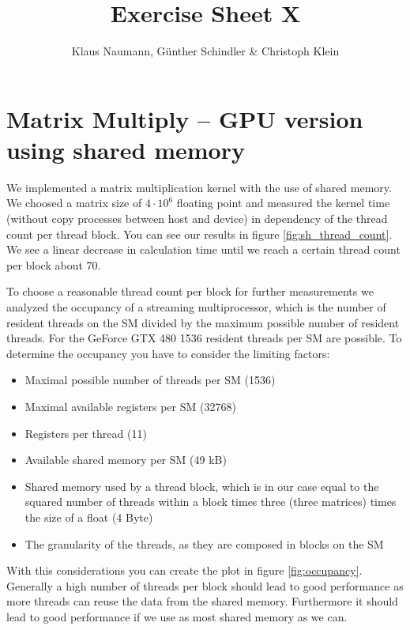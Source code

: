 \documentclass[DIV=12,oneside,a4paper]{scrartcl}
\begin{document}

\title{Exercise Sheet X}
\author{Klaus Naumann, G\"unther Schindler \& Christoph Klein}
\maketitle


\section{Matrix Multiply -- GPU version using shared memory}
We implemented a matrix multiplication kernel with the
use of shared memory. We choosed a matrix size of
$4\cdot 10^{6}$ floating point and measured the kernel time
(without copy processes between host and device) in dependency
of the thread count per thread block. You can see our results
in figure \ref{fig:sh_thread_count}. We see a linear decrease
in calculation time until we reach a certain thread count per
block about $70$. 

To choose a reasonable thread count per block
for further measurements we analyzed the occupancy of a streaming
multiprocessor, which is the number of resident threads on the
SM divided by the maximum possible number of resident threads.
For the GeForce GTX 480 1536 resident threads per SM are possible.
To determine the occupancy you have to consider the limiting 
factors:
\begin{itemize}
    \item Maximal possible number of threads per SM (1536)
    \item Maximal available registers per SM (32768)
    \item Registers per thread (11)
    \item Available shared memory per SM (49 kB)
    \item Shared memory used by a thread block, which is
        in our case equal to the squared number of threads
        within a block times three (three matrices) 
        times the size of a float (4 Byte)
    \item The granularity of the threads, as they are
        composed in blocks on the SM
\end{itemize}
With this considerations you can create the plot in figure
\ref{fig:occupancy}. Generally a high number of threads per
block should lead to good performance as more threads can
reuse the data from the shared memory. Furthermore it should
lead to good performance if we use as most shared memory as
we can. 
\end{document}
